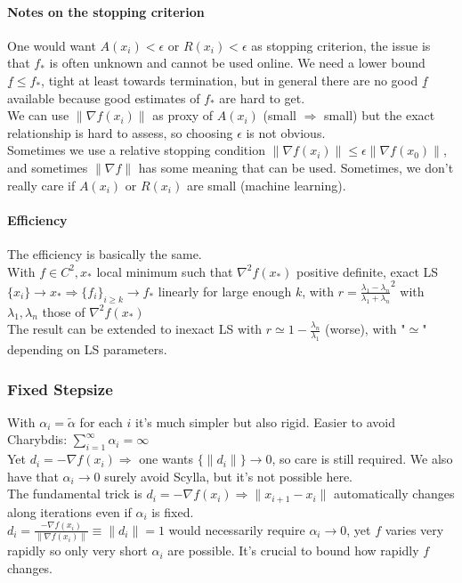 \documentclass[10pt]{report}
\begin{document}
\paragraph{Notes on the stopping criterion} One would want $A(x_i)<\epsilon$ or $R(x_i) < \epsilon$ as stopping criterion, the issue is that $f_*$ is often unknown and cannot be used online. We need a lower bound $\underline{f} \leq f_*$, tight at least towards termination, but in general there are no good $\underline{f}$ available because good estimates of $f_*$ are hard to get.\\
We can use $\|\nabla f(x_i)\|$ as proxy of $A(x_i)$ (small $\Rightarrow$ small) but the exact relationship is hard to assess, so choosing $\epsilon$ is not obvious.\\
Sometimes we use a relative stopping condition $\|\nabla f(x_i)\|\leq \epsilon\|\nabla f(x_0)\|$, and sometimes $\|\nabla f\|$ has some meaning that can be used. Sometimes, we don't really care if $A(x_i)$ or $R(x_i)$ are small (machine learning).
\paragraph{Efficiency} The efficiency is basically the same.\\
With $f\in C^2, x_*$ local minimum such that $\nabla^2f(x_*)$ positive definite, exact LS $\{x_i\}\rightarrow x_* \Rightarrow \{f_i\}_{i\geq k}\rightarrow f_*$ linearly for large enough $k$, with $r = \frac{\lambda_1 - \lambda_n}{\lambda_1 + \lambda_n}^2$ with $\lambda_1,\lambda_n$ those of $\nabla^2 f(x_*)$\\
The result can be extended to inexact LS with $r\simeq 1-\frac{\lambda_n}{\lambda_1}$ (worse), with "$\simeq$" depending on LS parameters.
\subsubsection{Fixed Stepsize}
With $\alpha_i = \tilde{\alpha}$ for each $i$ it's much simpler but also rigid. Easier to avoid Charybdis: $\sum_{i=1}^\infty \alpha_i = \infty$\\
Yet $d_i = -\nabla f(x_i) \Rightarrow$ one wants $\{\|d_i\|\}\rightarrow 0$, so care is still required. We also have that $\alpha_i\rightarrow 0$ surely avoid Scylla, but it's not possible here.\\
The fundamental trick is $d_i = -\nabla f(x_i) \Rightarrow \|x_{i+1} - x_i\|$ automatically changes along iterations even if $\alpha_i$ is fixed.\\
$d_i = \frac{-\nabla f(x_i)}{\|\nabla f(x_i)\|} \equiv \|d_i\| = 1$ would necessarily require $\alpha_i \rightarrow 0$, yet $f$ varies very rapidly so only very short $\alpha_i$ are possible. It's crucial to bound how rapidly $f$ changes.
\end{document}
